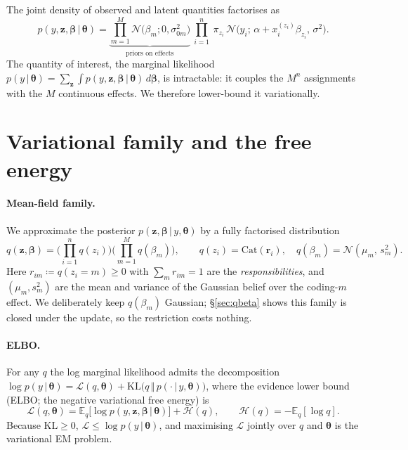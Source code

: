 \documentclass[11pt]{article}
\newcommand{\E}{\mathbb{E}}
\newcommand{\KL}{\mathrm{KL}}
\newcommand{\Cat}{\mathrm{Cat}}
\newcommand{\Nor}{\mathcal{N}}
\newcommand{\given}{\,\vert\,}
\newcommand{\sigsq}{\sigma^{2}}
\newcommand{\sigz}[1]{\sigma_{0#1}^{2}}
\theoremstyle{plain}
\theoremstyle{remark}
\begin{document}
The joint density of observed and latent quantities factorises as
\begin{equation}\label{eq:joint}
  p(y,\bm z,\bm\beta\given\bm\theta)
  =\underbrace{\prod_{m=1}^{M}\Nor\!\big(\beta_m;0,\sigz{m}\big)}_{\text{priors on effects}}
   \ \prod_{i=1}^{n}\ \pi_{z_i}\,
     \Nor\!\big(y_i;\,\alpha+x_i^{(z_i)}\beta_{z_i},\,\sigsq\big).
\end{equation}
The quantity of interest, the marginal likelihood
$p(y\given\bm\theta)=\sum_{\bm z}\int p(y,\bm z,\bm\beta\given\bm\theta)\,d\bm\beta$,
is intractable: it couples the $M^{n}$ assignments with the $M$ continuous
effects. We therefore lower-bound it variationally.

\section{Variational family and the free energy}\label{sec:elbo}

\paragraph{Mean-field family.} We approximate the posterior
$p(\bm z,\bm\beta\given y,\bm\theta)$ by a fully factorised distribution
\begin{equation}\label{eq:meanfield}
  q(\bm z,\bm\beta)
  =\Big(\prod_{i=1}^{n} q(z_i)\Big)\Big(\prod_{m=1}^{M} q(\beta_m)\Big),
  \qquad
  q(z_i)=\Cat(\bm r_i),\quad q(\beta_m)=\Nor(\mu_m,\,s_m^{2}).
\end{equation}
Here $r_{im}\coloneqq q(z_i=m)\ge 0$ with $\sum_m r_{im}=1$ are the
\emph{responsibilities}, and $(\mu_m,s_m^{2})$ are the mean and variance of the
Gaussian belief over the coding-$m$ effect. We deliberately keep $q(\beta_m)$
Gaussian; \S\ref{sec:qbeta} shows this family is closed under the update, so the
restriction costs nothing.

\paragraph{ELBO.} For any $q$ the log marginal likelihood admits the
decomposition $\log p(y\given\bm\theta)=\mathcal L(q,\bm\theta)
+\KL\!\big(q\,\Vert\,p(\cdot\given y,\bm\theta)\big)$, where the evidence lower
bound (ELBO; the negative variational free energy) is
\begin{equation}\label{eq:elbo-def}
  \mathcal L(q,\bm\theta)
  =\E_{q}\!\big[\log p(y,\bm z,\bm\beta\given\bm\theta)\big]
   +\mathcal H(q),
  \qquad
  \mathcal H(q)=-\E_q[\log q].
\end{equation}
Because $\KL\ge 0$, $\mathcal L\le\log p(y\given\bm\theta)$, and maximising
$\mathcal L$ jointly over $q$ and $\bm\theta$ is the variational EM problem.
\end{document}
